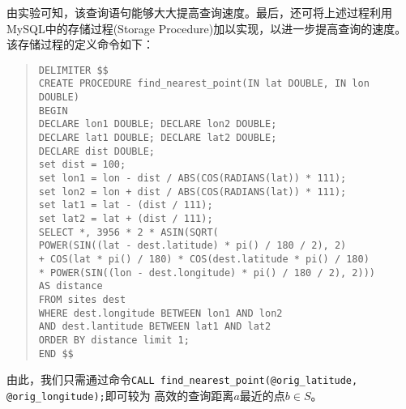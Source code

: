 由实验可知，该查询语句能够大大提高查询速度。最后，还可将上述过程利用MySQL中的存储过程(Storage
Procedure)加以实现，以进一步提高查询的速度。该存储过程的定义命令如下：

\begin{quote}
  \texttt{DELIMITER \$\$\\
    CREATE PROCEDURE find\_nearest\_point(IN lat DOUBLE, IN lon DOUBLE)\\
    BEGIN\\
    DECLARE lon1 DOUBLE; DECLARE lon2 DOUBLE;\\
    DECLARE lat1 DOUBLE; DECLARE lat2 DOUBLE;\\
    DECLARE dist DOUBLE;\\
    set dist = 100;\\
    set lon1 = lon - dist / ABS(COS(RADIANS(lat)) * 111);\\
    set lon2 = lon + dist / ABS(COS(RADIANS(lat)) * 111);\\
    set lat1 = lat - (dist / 111);\\
    set lat2 = lat + (dist / 111);\\
    SELECT *, 3956 * 2 * ASIN(SQRT(\\
    POWER(SIN((lat - dest.latitude) * pi() / 180 / 2), 2)\\
    + COS(lat * pi() / 180) * COS(dest.latitude * pi() / 180)\\
    * POWER(SIN((lon - dest.longitude) * pi() / 180 / 2), 2)))\\
    AS distance\\
    FROM sites dest\\
    WHERE dest.longitude BETWEEN lon1 AND lon2\\
    AND dest.lantitude BETWEEN lat1 AND lat2\\
    ORDER BY distance limit 1;\\
    END \$\$} 
\end{quote}

由此，我们只需通过命令\texttt{CALL find\_nearest\_point(@orig\_latitude, @orig\_longitude);}即可较为
高效的查询距离$a$最近的点$b\in S$。


